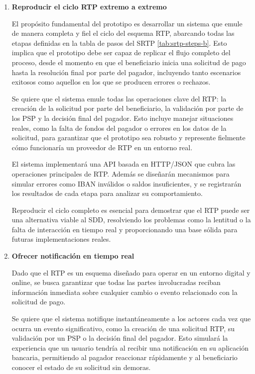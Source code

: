 \begin{enumerate}[label=\textbf{\arabic*}]
  \item \textbf{Reproducir el ciclo RTP extremo a extremo}
    
    El propósito fundamental del prototipo es desarrollar un sistema que emule de manera completa y fiel el ciclo del esquema RTP, abarcando todas las etapas definidas en la tabla de pasos del SRTP \ref{tab:srtp-steps-b}. Esto implica que el prototipo debe ser capaz de replicar el flujo completo del proceso, desde el momento en que el beneficiario inicia una solicitud de pago hasta la resolución final por parte del pagador, incluyendo tanto escenarios exitosos como aquellos en los que se producen errores o rechazos.
    
    Se quiere que el sistema emule todas las operaciones clave del RTP: la creación de la solicitud por parte del beneficiario, la validación por parte de los PSP y la decisión final del pagador. Esto incluye manejar situaciones reales, como la falta de fondos del pagador o errores en los datos de la solicitud, para garantizar que el prototipo sea robusto y represente fielmente cómo funcionaría un proveedor de RTP en un entorno real.
    
    El sistema implementará una API basada en HTTP/JSON que cubra las operaciones principales de RTP. Además se diseñarán mecanismos para simular errores como IBAN inválidos o saldos insuficientes, y se registrarán los resultados de cada etapa para analizar su comportamiento.
    
    Reproducir el ciclo completo es esencial para demostrar que el RTP puede ser una alternativa viable al SDD, resolviendo los problemas como la lentitud o la falta de interacción en tiempo real y proporcionando una base sólida para futuras implementaciones reales.

  \item \textbf{Ofrecer notificación en tiempo real}
    
    Dado que el RTP es un esquema diseñado para operar en un entorno digital y online, se busca garantizar que todas las partes involucradas reciban información inmediata sobre cualquier cambio o evento relacionado con la solicitud de pago.

   Se quiere que el sistema notifique instantáneamente a los actores cada vez que ocurra un evento significativo, como la creación de una solicitud RTP, su validación por un PSP o la decisión final del pagador. Esto simulará la experiencia que un usuario tendría al recibir una notificación en su aplicación bancaria, permitiendo al pagador reaccionar rápidamente y al beneficiario conocer el estado de su solicitud sin demoras.


\end{enumerate}
